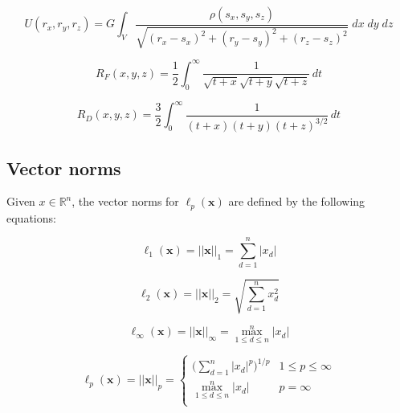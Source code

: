 \begin{equation}
    U(r_x, r_y, r_z) = G\int_V\frac{\rho{(s_x,s_y,s_z)}}{\sqrt{(r_x-s_x)^2+(r_y-s_y)^2+(r_z-s_z)^2}}\;dx\;dy\;dz
    \label{eq:ur-gen-rect}
\end{equation}

\begin{equation}
    R_F\!\left(x, y, z\right) = \frac{1}{2} \int_{0}^{\infty} \frac{1}{\sqrt{t + x} \sqrt{t + y} \sqrt{t + z}} \, dt
    \label{eq:elliptic_RF}
\end{equation}

\begin{equation}
    R_D\!\left(x, y, z\right) = \frac{3}{2} \int_{0}^{\infty} \frac{1}{\left(t + x\right) \left(t + y\right) {\left(t + z\right)}^{3 / 2}} \, dt
    \label{eq:elliptic_RD}
\end{equation}


\subsection{Vector norms\label{appendix:vector_norms}}
Given $x\in\mathbb{R}^n$, the vector norms for $\ell_p(\mathbf{x})$ are defined
by the following equations:

\begin{equation}
    \ell_1(\mathbf{x})=||\mathbf{x}||_1 = \sum_{d=1}^n |x_d|
\end{equation}

\begin{equation}
    \ell_2(\mathbf{x})=||\mathbf{x}||_2 = \sqrt{\sum_{d=1}^n x_d^2}
\end{equation}

\begin{equation}
    \ell_\infty(\mathbf{x})=||\mathbf{x}||_\infty = \max_{1\leq{d}\leq{n}}^n |x_d|
\end{equation}

\begin{equation}
    \ell_p(\mathbf{x})=||\mathbf{x}||_p=
    \begin{cases}
      \bigg(\sum_{d=1}^n |x_d|^p\bigg)^{1/p}    &  1\leq{}p\le \infty \\
      \max_{1\leq{d}\leq{n}}^n |x_d|            &  p=\infty \\
   \end{cases}
\end{equation}


